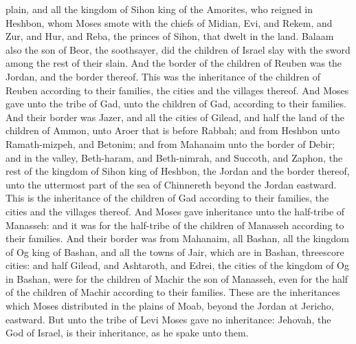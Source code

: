 plain, and all the kingdom of Sihon king of the Amorites, who reigned in Heshbon, whom Moses smote with the chiefs of Midian, Evi, and Rekem, and Zur, and Hur, and Reba, the princes of Sihon, that dwelt in the land. Balaam also the son of Beor, the soothsayer, did the children of Israel slay with the sword among the rest of their slain. And the border of the children of Reuben was the Jordan, and the border thereof. This was the inheritance of the children of Reuben according to their families, the cities and the villages thereof.  And Moses gave unto the tribe of Gad, unto the children of Gad, according to their families. And their border was Jazer, and all the cities of Gilead, and half the land of the children of Ammon, unto Aroer that is before Rabbah; and from Heshbon unto Ramath-mizpeh, and Betonim; and from Mahanaim unto the border of Debir; and in the valley, Beth-haram, and Beth-nimrah, and Succoth, and Zaphon, the rest of the kingdom of Sihon king of Heshbon, the Jordan and the border thereof, unto the uttermost part of the sea of Chinnereth beyond the Jordan eastward. This is the inheritance of the children of Gad according to their families, the cities and the villages thereof.  And Moses gave inheritance unto the half-tribe of Manasseh: and it was for the half-tribe of the children of Manasseh according to their families. And their border was from Mahanaim, all Bashan, all the kingdom of Og king of Bashan, and all the towns of Jair, which are in Bashan, threescore cities: and half Gilead, and Ashtaroth, and Edrei, the cities of the kingdom of Og in Bashan, were for the children of Machir the son of Manasseh, even for the half of the children of Machir according to their families.  These are the inheritances which Moses distributed in the plains of Moab, beyond the Jordan at Jericho, eastward. But unto the tribe of Levi Moses gave no inheritance: Jehovah, the God of Israel, is their inheritance, as he spake unto them. 

